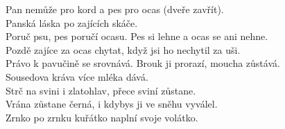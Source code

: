 \begin{multicols}{\value{columnsgames}}
Pan nemůže pro kord a pes pro ocas (dveře zavřít).\\
Panská láska po zajících skáče.\\
Poruč psu, pes poručí ocasu. Pes si lehne a ocas se ani nehne.\\
Pozdě zajíce za ocas chytat, když jsi ho nechytil za uši.\\
Právo k pavučině se srovnává. Brouk ji prorazí, moucha zůstává.\\
Sousedova kráva více mléka dává.\\
Strč na svini i zlatohlav, přece sviní zůstane.\\
Vrána zůstane černá, i kdybys ji ve sněhu vyválel.\\
Zrnko po zrnku kuřátko naplní svoje volátko.\\

\end{multicols}
\clearpage
